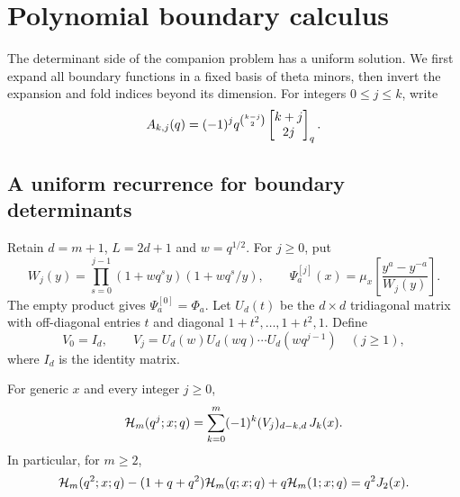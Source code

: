 \section{Polynomial boundary calculus}\label{sec:boundary}

The determinant side of the companion problem has a uniform solution. We first expand all boundary functions in a fixed basis of theta minors, then invert the expansion and fold indices beyond its dimension. For integers $0\le j\le k$, write
\begin{equation}\label{eq:Adef}
A_{k,j}(q)=(-1)^jq^{\binom{k-j}2}\begin{bmatrix}k+j\\2j\end{bmatrix}_q.
\end{equation}

\subsection{A uniform recurrence for boundary determinants}
Retain $d=m+1$, $L=2d+1$ and $w=q^{1/2}$. For $j\ge0$, put
\[
W_j(y)=\prod_{s=0}^{j-1}(1+wq^sy)(1+wq^s/y),\qquad \Psi^{[j]}_a(x)=\mu_x\left[\frac{y^a-y^{-a}}{W_j(y)}\right].
\]
The empty product gives $\Psi^{[0]}_a=\Phi_a$. Let $U_d(t)$ be the $d\times d$ tridiagonal matrix with off-diagonal entries $t$ and diagonal $1+t^2,\dots,1+t^2,1$. Define
\[
V_0=I_d,\qquad V_j=U_d(w)U_d(wq)\cdots U_d(wq^{j-1})\quad(j\ge1),
\]
where $I_d$ is the identity matrix.

\begin{lemma}\label{lem:bdexp}
For generic $x$ and every integer $j\ge0$,
\begin{equation}\label{eq:bdexp}
\mathcal{H}_m(q^j;x;q)=\sum_{k=0}^m(-1)^k(V_j)_{d-k,d}\,J_k(x).
\end{equation}
In particular, for $m\ge2$,
\begin{equation}\label{eq:bdexp2}
\mathcal{H}_m(q^2;x;q)-(1+q+q^2)\mathcal{H}_m(q;x;q)+q\mathcal{H}_m(1;x;q)=q^2J_2(x).
\end{equation}
\end{lemma}

